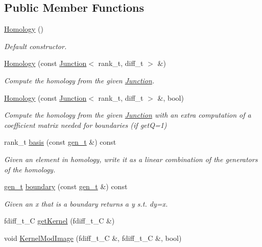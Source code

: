 \subsection*{Public Member Functions}
\begin{DoxyCompactItemize}
\item 
\hyperlink{classMackey_1_1Homology_a3580b194f986bd59a02fb84db97e00f2}{Homology} ()
\begin{DoxyCompactList}\small\item\em Default constructor. \end{DoxyCompactList}\item 
\hyperlink{classMackey_1_1Homology_a31e26f0fb8e1cd7f0506ae1dbc97ea22}{Homology} (const \hyperlink{classMackey_1_1Junction}{Junction}$<$ rank\+\_\+t, diff\+\_\+t $>$ \&)
\begin{DoxyCompactList}\small\item\em Compute the homology from the given \hyperlink{classMackey_1_1Junction}{Junction}. \end{DoxyCompactList}\item 
\hyperlink{classMackey_1_1Homology_af42f480509ef68df47308c0f506d44c8}{Homology} (const \hyperlink{classMackey_1_1Junction}{Junction}$<$ rank\+\_\+t, diff\+\_\+t $>$ \&, bool)
\begin{DoxyCompactList}\small\item\em Compute the homology from the given \hyperlink{classMackey_1_1Junction}{Junction} with an extra computation of a coefficient matrix needed for boundaries (if getQ=1) \end{DoxyCompactList}\item 
rank\+\_\+t \hyperlink{classMackey_1_1Homology_a2e6fb6da3abdba934a1eb2f4236623cb}{basis} (const \hyperlink{classMackey_1_1Homology_a0f7541ee6181c75cb7efa41f3b63f0a5}{gen\+\_\+t} \&) const
\begin{DoxyCompactList}\small\item\em Given an element in homology, write it as a linear combination of the generators of the homology. \end{DoxyCompactList}\item 
\hyperlink{classMackey_1_1Homology_a0f7541ee6181c75cb7efa41f3b63f0a5}{gen\+\_\+t} \hyperlink{classMackey_1_1Homology_aeb3cbf5cc7cb166e8e0a552dda57d05b}{boundary} (const \hyperlink{classMackey_1_1Homology_a0f7541ee6181c75cb7efa41f3b63f0a5}{gen\+\_\+t} \&) const
\begin{DoxyCompactList}\small\item\em Given an x that is a boundary returns a y s.\+t. dy=x. \end{DoxyCompactList}\item 
fdiff\+\_\+t\+\_\+C \hyperlink{classMackey_1_1Homology_a72296e393c6f22a526375b0169daab94}{get\+Kernel} (fdiff\+\_\+t\+\_\+C \&)
\item 
void \hyperlink{classMackey_1_1Homology_a902c8dfef7da8ad9f5e03d16eb60a423}{Kernel\+Mod\+Image} (fdiff\+\_\+t\+\_\+C \&, fdiff\+\_\+t\+\_\+C \&, bool)
\end{DoxyCompactItemize}
